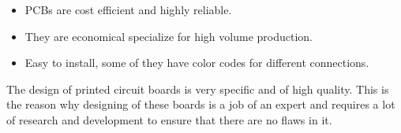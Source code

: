 \begin{itemize}
\item PCBs are cost efficient and highly reliable.
\item They are economical specialize for high volume production. 
\item Easy to install, some of they have color codes for different connections.
\end{itemize} \hfill \break

The design of printed circuit boards is very specific and of high quality. This is the reason why designing of these boards is a job of an expert and requires a lot of research and development to ensure that there are no flaws in it.

\pagebreak